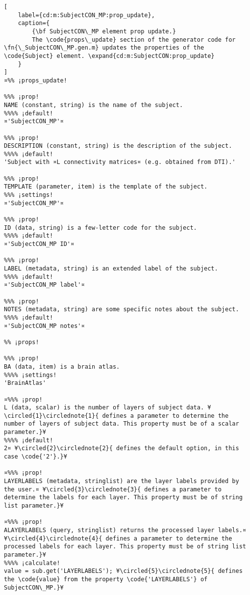 \documentclass{tufte-handout}
\begin{document}
\begin{lstlisting}[
	label={cd:m:SubjectCON_MP:prop_update},
	caption={
		{\bf SubjectCON\_MP element prop update.}
		The \code{props\_update} section of the generator code for \fn{\_SubjectCON\_MP.gen.m} updates the properties of the \code{Subject} element. \expand{cd:m:SubjectCON:prop_update}
	}
]
¤%% ¡props_update!

%%% ¡prop!
NAME (constant, string) is the name of the subject.
%%%% ¡default!
¤'SubjectCON_MP'¤

%%% ¡prop!
DESCRIPTION (constant, string) is the description of the subject.
%%%% ¡default!
'Subject with ¤L connectivity matrices¤ (e.g. obtained from DTI).'

%%% ¡prop!
TEMPLATE (parameter, item) is the template of the subject.
%%% ¡settings!
¤'SubjectCON_MP'¤

%%% ¡prop!
ID (data, string) is a few-letter code for the subject.
%%%% ¡default!
¤'SubjectCON_MP ID'¤

%%% ¡prop!
LABEL (metadata, string) is an extended label of the subject.
%%%% ¡default!
¤'SubjectCON_MP label'¤

%%% ¡prop!
NOTES (metadata, string) are some specific notes about the subject.
%%%% ¡default!
¤'SubjectCON_MP notes'¤

%% ¡props!

%%% ¡prop!
BA (data, item) is a brain atlas.
%%%% ¡settings!
'BrainAtlas'

¤%%% ¡prop! 
L (data, scalar) is the number of layers of subject data. ¥\circled{1}\circlednote{1}{ defines a parameter to determine the number of layers of subject data. This property must be of a scalar parameter.}¥
%%%% ¡default!
2¤ ¥\circled{2}\circlednote{2}{ defines the default option, in this case \code{'2'}.}¥

¤%%% ¡prop! 
LAYERLABELS (metadata, stringlist) are the layer labels provided by the user.¤ ¥\circled{3}\circlednote{3}{ defines a parameter to determine the labels for each layer. This property must be of string list parameter.}¥

¤%%% ¡prop!
ALAYERLABELS (query, stringlist) returns the processed layer labels.¤ ¥\circled{4}\circlednote{4}{ defines a parameter to determine the processed labels for each layer. This property must be of string list parameter.}¥
%%%% ¡calculate!
value = sub.get('LAYERLABELS'); ¥\circled{5}\circlednote{5}{ defines the \code{value} from the property \code{'LAYERLABELS'} of SubjectCON\_MP.}¥


\end{lstlisting}
\end{document}
